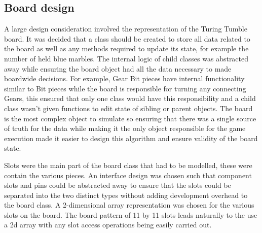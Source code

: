 \documentclass{l4proj}
\begin{document}
\subsection{Board design}
A large design consideration involved the representation of the Turing Tumble board. It was decided that a class should be created to store all data related to the board as well as any methods required to update its state, for example the number of held blue marbles. The internal logic of child classes was abstracted away while ensuring the board object had all the data necessary to made boardwide decisions. For example, Gear Bit pieces have internal functionality similar to Bit pieces while the board is responsible for turning any connecting Gears, this ensured that only one class would have this responsibility and a child class wasn't given functions to edit state of sibling or parent objects. The board is the most complex object to simulate so ensuring that there was a single source of truth for the data while making it the only object responsible for the game execution made it easier to design this algorithm and ensure validity of the board state. 

Slots were the main part of the board class that had to be modelled, these were contain the various pieces. An interface design was chosen such that component slots and pins could be abstracted away to ensure that the slots could be separated into the two distinct types without adding development overhead to the board class. A 2-dimensional array representation was chosen for the various slots on the board. The board pattern of 11 by 11 slots leads naturally to the use a 2d array with any slot access operations being easily carried out. 


\end{document}
